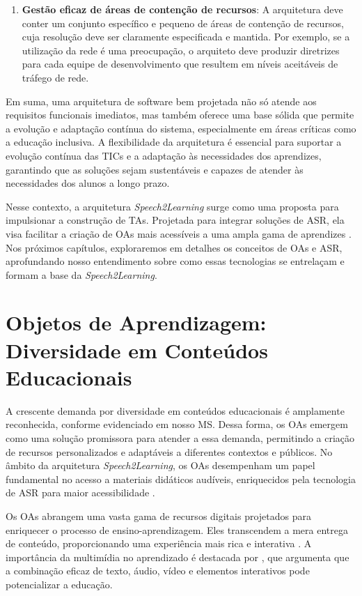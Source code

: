 \begin{enumerate}
    \item \textbf{Gestão eficaz de áreas de contenção de recursos}: A arquitetura deve conter um conjunto específico e pequeno de áreas de contenção de recursos, cuja resolução deve ser claramente especificada e mantida. Por exemplo, se a utilização da rede é uma preocupação, o arquiteto deve produzir diretrizes para cada equipe de desenvolvimento que resultem em níveis aceitáveis de tráfego de rede.
\end{enumerate}

Em suma, uma arquitetura de software bem projetada não só atende aos requisitos funcionais imediatos, mas também oferece uma base sólida que permite a evolução e adaptação contínua do sistema, especialmente em áreas críticas como a educação inclusiva. A flexibilidade da arquitetura é essencial para suportar a evolução contínua das TICs e a adaptação às necessidades dos aprendizes, garantindo que as soluções sejam sustentáveis e capazes de atender às necessidades dos alunos a longo prazo.

Nesse contexto, a arquitetura \textit{Speech2Learning} surge como uma proposta para impulsionar a construção de TAs. Projetada para integrar soluções de ASR, ela visa facilitar a criação de OAs mais acessíveis a uma ampla gama de aprendizes \cite{FalvoJr2023_HICSS}. Nos próximos capítulos, exploraremos em detalhes os conceitos de OAs e ASR, aprofundando nosso entendimento sobre como essas tecnologias se entrelaçam e formam a base da \textit{Speech2Learning}.

\section{Objetos de Aprendizagem: Diversidade em Conteúdos Educacionais}
\label{section:foundation:lo}

A crescente demanda por diversidade em conteúdos educacionais é amplamente reconhecida, conforme evidenciado em nosso MS. Dessa forma, os OAs emergem como uma solução promissora para atender a essa demanda, permitindo a criação de recursos personalizados e adaptáveis a diferentes contextos e públicos. No âmbito da arquitetura \textit{Speech2Learning}, os OAs desempenham um papel fundamental no acesso a materiais didáticos audíveis, enriquecidos pela tecnologia de ASR para maior acessibilidade \cite{FalvoJr2023_HICSS}.

Os OAs abrangem uma vasta gama de recursos digitais projetados para enriquecer o processo de ensino-aprendizagem. Eles transcendem a mera entrega de conteúdo, proporcionando uma experiência mais rica e interativa \cite{Wiley2000}. A importância da multimídia no aprendizado é destacada por , que argumenta que a combinação eficaz de texto, áudio, vídeo e elementos interativos pode potencializar a educação.

